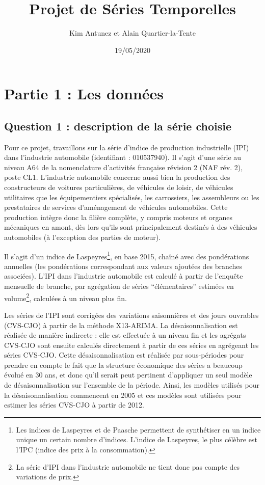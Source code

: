 \documentclass[,french]{article}
\title{Projet de Séries Temporelles}
\author{Kim Antunez et Alain Quartier-la-Tente}
\date{19/05/2020}
\begin{document}
\maketitle

{
\hypersetup{linkcolor=}
\setcounter{tocdepth}{3}
\tableofcontents
}
\thispagestyle{empty}
\newpage\setcounter{page}{1}

\hypertarget{partie-1-les-donnuxe9es}{%
\section{Partie 1 : Les données}\label{partie-1-les-donnuxe9es}}

\hypertarget{question-1-description-de-la-suxe9rie-choisie}{%
\subsection{Question 1 : description de la série choisie}\label{question-1-description-de-la-suxe9rie-choisie}}

Pour ce projet, travaillons sur la série d'indice de production industrielle (IPI) dans l'industrie automobile (identifiant : 010537940).
Il s'agit d'une série au niveau A64 de la nomenclature d'activités française révision 2 (NAF rév. 2), poste CL1.
L'industrie automobile concerne aussi bien la production des constructeurs de voitures particulières, de véhicules de loisir, de véhicules utilitaires que les équipementiers spécialisés, les carrossiers, les assembleurs ou les prestataires de services d'aménagement de véhicules automobiles.
Cette production intègre donc la filière complète, y compris moteurs et organes mécaniques en amont, dès lors qu'ils sont principalement destinés à des véhicules automobiles (à l'exception des parties de moteur).

Il s'agit d'un indice de Laspeyres\footnote{Les indices de Laspeyres et de Paasche permettent de synthétiser en un indice unique un certain nombre d'indices. L'indice de Laspeyres, le plus célèbre est l'IPC (indice des prix à la consommation).}, en base 2015, chaîné avec des pondérations annuelles (les pondérations correspondant aux valeurs ajoutées des branches associées).
L'IPI dans l'industrie automobile est calculé à partir de l'enquête mensuelle de branche, par agrégation de séries ``élémentaires'' estimées en volume\footnote{La série d'IPI dans l'industrie automobile ne tient donc pas compte des variations de prix.}, calculées à un niveau plus fin.

Les séries de l'IPI sont corrigées des variations saisonnières et des jours ouvrables (CVS-CJO) à partir de la méthode X13-ARIMA.
La désaisonnalisation est réalisée de manière indirecte : elle est effectuée à un niveau fin et les agrégats CVS-CJO sont ensuite calculés directement à partir de ces séries en agrégeant les séries CVS-CJO.
Cette désaisonnalisation est réalisée par sous-périodes pour prendre en compte le fait que la structure économique des séries a beaucoup évolué en 30 ans, et donc qu'il serait peut pertinent d'appliquer un seul modèle de désaisonnalisation sur l'ensemble de la période.
Ainsi, les modèles utilisés pour la désaisonnalisation commencent en 2005 et ces modèles sont utilisées pour estimer les séries CVS-CJO à partir de 2012.
\end{document}
